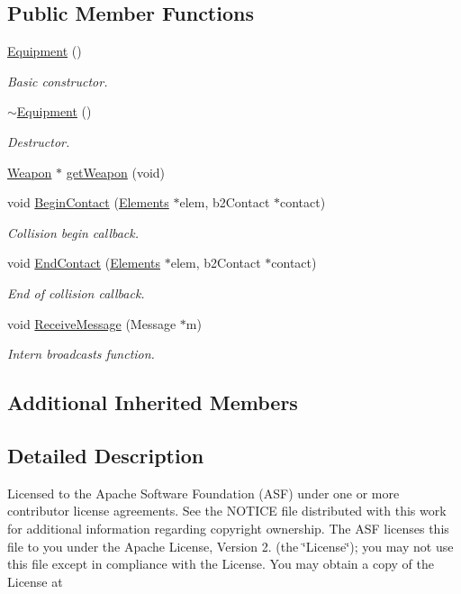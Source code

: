 \subsection*{Public Member Functions}
\begin{DoxyCompactItemize}
\item 
\hyperlink{class_equipment_a2bd67c4254f2074f4f7469f29a20e760}{Equipment} ()
\begin{DoxyCompactList}\small\item\em Basic constructor. \end{DoxyCompactList}\item 
\hyperlink{class_equipment_a3e7f53e57fa3004b5a4490e2c7a1fbaf}{$\sim$\-Equipment} ()
\begin{DoxyCompactList}\small\item\em Destructor. \end{DoxyCompactList}\item 
\hyperlink{class_weapon}{Weapon} $\ast$ \hyperlink{class_equipment_a54fd1c2d6cca6b4d2584eb0cf8725bd2}{get\-Weapon} (void)
\item 
void \hyperlink{class_equipment_a0c706b45578e8d01fec7b8ee1b773987}{Begin\-Contact} (\hyperlink{class_elements}{Elements} $\ast$elem, b2\-Contact $\ast$contact)
\begin{DoxyCompactList}\small\item\em Collision begin callback. \end{DoxyCompactList}\item 
void \hyperlink{class_equipment_abda1acd976a1c33f3aa398b3a9a64555}{End\-Contact} (\hyperlink{class_elements}{Elements} $\ast$elem, b2\-Contact $\ast$contact)
\begin{DoxyCompactList}\small\item\em End of collision callback. \end{DoxyCompactList}\item 
void \hyperlink{class_equipment_ab195be955597ce6f64c117d675df3af4}{Receive\-Message} (Message $\ast$m)
\begin{DoxyCompactList}\small\item\em Intern broadcasts function. \end{DoxyCompactList}\end{DoxyCompactItemize}
\subsection*{Additional Inherited Members}


\subsection{Detailed Description}
Licensed to the Apache Software Foundation (A\-S\-F) under one or more contributor license agreements. See the N\-O\-T\-I\-C\-E file distributed with this work for additional information regarding copyright ownership. The A\-S\-F licenses this file to you under the Apache License, Version 2. (the \char`\"{}\-License\char`\"{}); you may not use this file except in compliance with the License. You may obtain a copy of the License at

